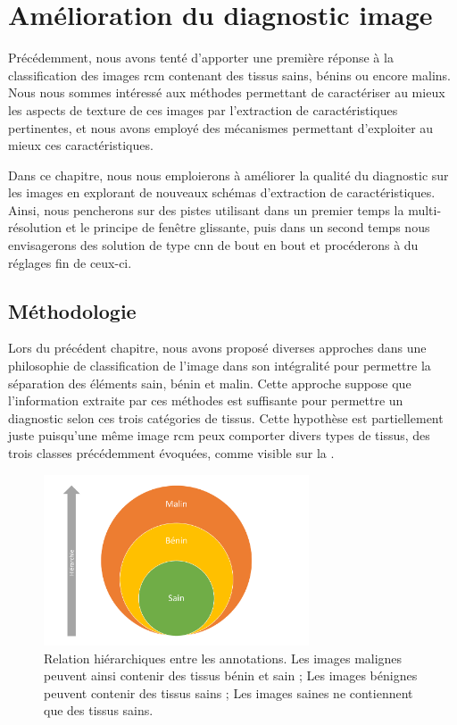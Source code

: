 \chapter{Amélioration du diagnostic image}
\label{chap:chapter_5}
\chapterintro
Précédemment, nous avons tenté d'apporter une première réponse à la classification des images \gls{rcm} contenant des tissus sains, bénins ou encore malins. Nous nous sommes intéressé aux méthodes permettant de caractériser au mieux les aspects de texture de ces images par l'extraction de caractéristiques pertinentes, et nous avons employé des mécanismes permettant d'exploiter au mieux ces caractéristiques.\par

Dans ce chapitre, nous nous emploierons à améliorer la qualité du diagnostic sur les images en explorant de nouveaux schémas d'extraction de caractéristiques. Ainsi, nous pencherons sur des pistes utilisant dans un premier temps la multi-résolution et le principe de fenêtre glissante, puis dans un second temps nous envisagerons des solution de type \gls{cnn} de bout en bout et procéderons à du réglages fin de ceux-ci.\par

\newpage

\section{Méthodologie}
Lors du précédent chapitre, nous avons proposé diverses approches dans une philosophie de classification de l'image dans son intégralité pour permettre la séparation des éléments sain, bénin et malin. Cette approche suppose que l'information extraite par ces méthodes est suffisante pour permettre un diagnostic selon ces trois catégories de tissus. Cette hypothèse est partiellement juste puisqu'une même image \gls{rcm} peux comporter divers types de tissus, des trois classes précédemment évoquées, comme visible sur la .\par

\begin{figure}[H]
    \centering
    \includegraphics[width=0.7\textwidth]{contents/chapter_5/resources/scheme_annotations_hierarchy.pdf}
    \caption{Relation hiérarchiques entre les annotations. Les images malignes peuvent ainsi contenir des tissus bénin et sain ; Les images bénignes peuvent contenir des tissus sains ; Les images saines ne contiennent que des tissus sains.}
    \label{fig:scheme_annotations_hierarchy}
\end{figure}\par

